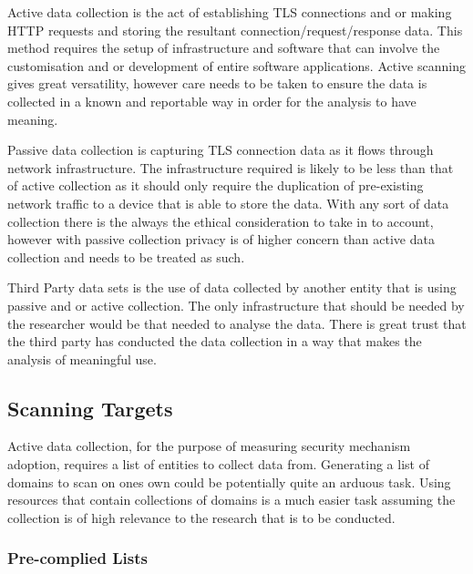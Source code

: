 \documentclass{mscreport}
\begin{document}
\vspace{0.3cm} \noindent
Active data collection is the act of establishing TLS connections and or making HTTP requests and storing the resultant connection/request/response data. This method requires the setup of infrastructure and software that can involve the customisation and or development of entire software applications. Active scanning gives great versatility, however care needs to be taken to ensure the data is collected in a known and reportable way in order for the analysis to have meaning.

\vspace{0.3cm} \noindent
Passive data collection is capturing TLS connection data as it flows through network infrastructure. The infrastructure required is likely to be less than that of active collection as it should only require the duplication of pre-existing network traffic to a device that is able to store the data. With any sort of data collection there is the always the ethical consideration to take in to account, however with passive collection privacy is of higher concern than active data collection and needs to be treated as such.

\vspace{0.3cm} \noindent
Third Party data sets is the use of data collected by another entity that is using passive and or active collection. The only infrastructure that should be needed by the researcher would be that needed to analyse the data. There is great trust that the third party has conducted the data collection in a way that makes the analysis of meaningful use.

\subsection{Scanning Targets}
Active data collection, for the purpose of measuring security mechanism adoption, requires a list of entities to collect data from. Generating a list of domains to scan on ones own could be potentially quite an arduous task. Using resources that contain collections of domains is a much easier task assuming the collection is of high relevance to the research that is to be conducted.

\subsubsection{Pre-complied Lists}
\end{document}
